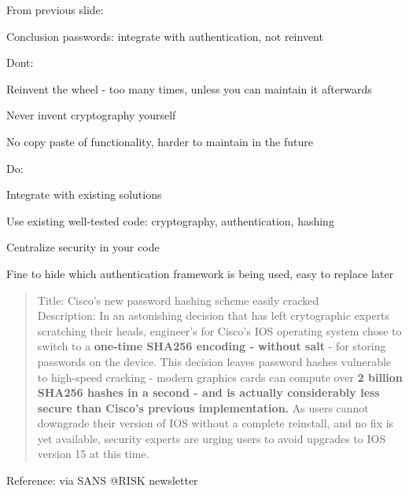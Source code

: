 \documentclass[Screen16to9,17pt]{foils}
\begin{document}
From previous slide:\\
\centerline{Conclusion passwords: integrate with authentication, not reinvent}


\begin{list1}
\item Dont:
\begin{list2}
\item Reinvent the wheel - too many times, unless you can maintain it afterwards
\item Never invent cryptography yourself
\item No copy paste of functionality, harder to maintain in the future
\end{list2}
\item Do:
\begin{list2}
\item Integrate with existing solutions
\item Use existing well-tested code: cryptography, authentication, hashing
\item Centralize security in your code
\item Fine to hide which authentication framework is being used, easy to replace later
\end{list2}
\end{list1}


\begin{quote}
Title: Cisco's new password hashing scheme easily cracked\\

Description: In an astonishing decision that has left crytographic
experts scratching their heads, engineer's for Cisco's IOS operating
system chose to switch to a {\bf one-time SHA256 encoding - without salt} -
for storing passwords on the device. This decision leaves password
hashes vulnerable to high-speed cracking - modern graphics cards can
compute over {\bf 2 billion SHA256 hashes in a second - and is actually
considerably less secure than Cisco's previous implementation.} As users
cannot downgrade their version of IOS without a complete reinstall, and
no fix is yet available, security experts are urging users to avoid
upgrades to IOS version 15 at this time.
\end{quote}

Reference: via SANS @RISK newsletter\\
\end{document}
